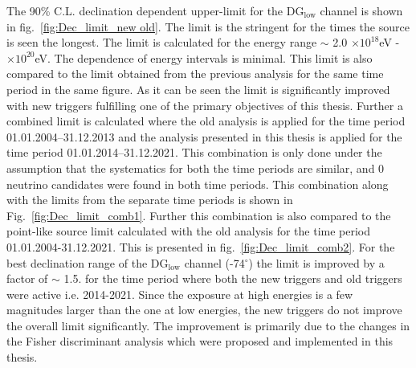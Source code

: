 The 90\% C.L. declination dependent upper-limit for the DG$_{\text{low}}$ channel is shown in fig.~\ref{fig:Dec_limit_new old}. The limit is the stringent for the times the source is seen the longest. The limit is calculated for the energy range $\sim$ 2.0 $\times 10^{18}$eV - $\times 10^{20}$eV. The dependence of energy intervals is minimal. This limit is also compared to the limit obtained from the previous analysis for the same time period in the same figure. As it can be seen the limit is significantly improved with new triggers fulfilling one of the primary objectives of this thesis. Further a combined limit is calculated where the old analysis is applied for the time period 01.01.2004–31.12.2013 and the analysis presented in this thesis is applied for the time period 01.01.2014–31.12.2021. This combination is only done under the assumption that the systematics for both the time periods are similar, and 0 neutrino candidates were found in both time periods. This combination along with the limits from the separate time periods is shown in Fig.~\ref{fig:Dec_limit_comb1}. Further this combination is also compared to the point-like source limit calculated with the old analysis for the time period 01.01.2004-31.12.2021. This is presented in fig.~\ref{fig:Dec_limit_comb2}. For the best declination range of the DG$_{\text{low}}$ channel (-74$^{\circ}$) the limit is improved by a factor of $\sim$ 1.5. for the time period where both the new triggers and old triggers were active i.e. 2014-2021. Since the exposure at high energies is a few magnitudes larger than the one at low energies, the new triggers do not improve the overall limit significantly. The improvement is primarily due to the changes in the Fisher discriminant analysis which were proposed and implemented in this thesis.



